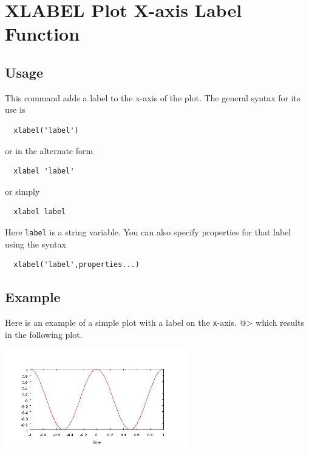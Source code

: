 \section{XLABEL Plot X-axis Label Function}

\subsection{Usage}

This command adds a label to the x-axis of the plot.  The general syntax
for its use is
\begin{verbatim}
  xlabel('label')
\end{verbatim}
or in the alternate form
\begin{verbatim}
  xlabel 'label'
\end{verbatim}
or simply
\begin{verbatim}
  xlabel label
\end{verbatim}
Here \verb|label| is a string variable.  You can also specify properties
for that label using the syntax
\begin{verbatim}
  xlabel('label',properties...) 
\end{verbatim}
\subsection{Example}

Here is an example of a simple plot with a label on the \verb|x|-axis.
@>
which results in the following plot.


\centerline{\includegraphics[width=8cm]{xlabel1}}

